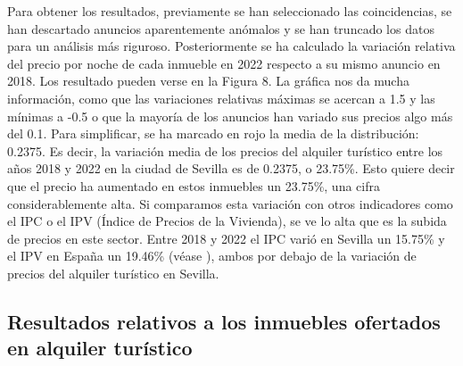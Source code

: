 \documentclass[a4paper,10pt]{article}
\begin{document}
            Para obtener los resultados, previamente se han seleccionado las coincidencias, se han descartado 
            anuncios aparentemente anómalos y se han truncado los datos para un análisis más riguroso. Posteriormente se ha calculado la variación
            relativa del precio por noche de cada inmueble en 2022 respecto a su mismo anuncio en 2018. Los resultado pueden verse 
            en la Figura 8. La gráfica nos da mucha información, como que las variaciones relativas máximas se acercan a 1.5 y las mínimas 
            a -0.5 o que la mayoría de los anuncios han variado sus precios algo más del 0.1. Para simplificar, se ha marcado en rojo la media de 
            la distribución: 0.2375. Es decir, la variación media de los precios del alquiler turístico entre los años 2018 y 2022 en la ciudad de Sevilla
            es de 0.2375, o 23.75\%. Esto quiere decir que el precio ha aumentado en estos inmuebles un 23.75\%, una cifra considerablemente alta.
            Si comparamos esta variación con otros indicadores como el IPC o el IPV (Índice de Precios de la Vivienda), se ve lo alta que es la subida de 
            precios en este sector. Entre 2018 y 2022 el IPC varió en Sevilla un 15.75\% y el IPV en España un 19.46\% (véase \cite[(1) y (2)]{ine}), ambos por
            debajo de la variación de precios del alquiler turístico en Sevilla.

        \clearpage 

        \subsection{Resultados relativos a los inmuebles ofertados en alquiler turístico}
\end{document}
